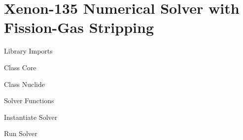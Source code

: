 \chapter{Xenon-135 Numerical Solver with Fission-Gas Stripping}
\label{app:solver}

\begin{code}\caption{Library Imports}
    \label{code:solverimports}\end{code}

\begin{code}\caption{Class Core}
    \label{code:classcore}\end{code}
    \clearpage

\begin{code}\caption{Class Nuclide}
    \label{code:classnuclide}\end{code}
    \clearpage

\clearpage
\begin{code}\caption{Solver Functions}
    \label{code:solverfunctions}\end{code}

\clearpage
\begin{code}\caption{Instantiate Solver}
    \label{code:instantiate}\end{code}

\clearpage
\begin{code}\caption{Run Solver}
        \label{code:runsolver}\end{code}
    
